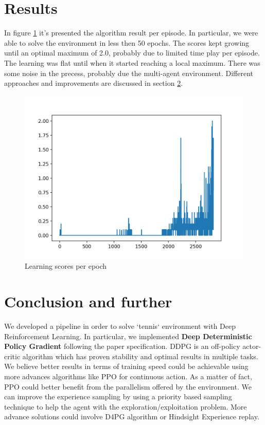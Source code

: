 \documentclass[11pt]{article}
\begin{document}
\section{Results}
\label{sec:org09be8dc}
In figure \ref{fig:org15b44d9} it's presented the algorithm result per episode. In
particular, we were able to solve the environment in less then 50 epochs. The
scores kept growing until an optimal maximum of 2.0, probably due to limited
time play per episode. The learning was flat until when it started reaching a
local maximum. There was some noise in the precess, probably due the multi-agent
environment. Different approaches and improvements are discussed in section
\ref{sec:orgbd1153e}.

\begin{figure}[htbp]
\centering
\includegraphics[width=.9\linewidth]{../contents/solved.png}
\caption{\label{fig:org15b44d9}Learning scores per epoch}
\end{figure}

\section{Conclusion and further}
\label{sec:orgbd1153e}
We developed a pipeline in order to solve `tennis` environment with Deep
Reinforcement Learning. In particular, we implemented \textbf{Deep Deterministic Policy
Gradient} following the paper specification. DDPG is an off-policy actor-critic
algorithm which has proven stability and optimal results in multiple tasks. We
believe better results in terms of training speed could be achievable using more
advances algorithms like PPO for continuous action. As a matter of fact, PPO
could better benefit from the parallelism offered by the environment. We can
improve the experience sampling by using a priority based sampling technique to
help the agent with the exploration/exploitation problem. More advance solutions
could involve D4PG algorithm or Hindsight Experience replay. 
\end{document}

